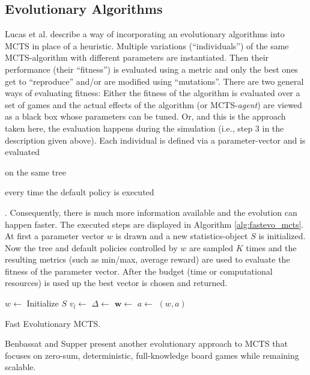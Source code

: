 \subsection{Evolutionary Algorithms}
\label{ss:evo_alg}
Lucas et al. \cite{lucas2014fast} describe a way of incorporating an evolutionary algorithms into  MCTS in place of a heuristic. Multiple variations (\enquote{individuals}) of the same MCTS-algorithm with different parameters are instantiated. Then their performance (their \enquote{fitness}) is evaluated using a metric and only the best ones get to \enquote{reproduce} and/or are modified using \enquote{mutations}. There are two general ways of evaluating fitness: Either the fitness of the algorithm is evaluated over a set of games and the actual effects of the algorithm (or MCTS-\textit{agent}) are viewed as a black box whose parameters can be tuned. Or, and this is the approach taken here, the evaluation happens during the simulation (i.e., step 3 in the description given above). Each individual is defined via a parameter-vector and is evaluated \begin{enumerate*}[label=\alph*)]
    \item on the same tree
    \item every time the default policy is executed 
\end{enumerate*}. Consequently, there is much more information available and the evolution can happen faster. The executed steps are displayed in Algorithm \ref{alg:fastevo_mcts}. At first a parameter vector $w$ is drawn and a new statistics-object $S$ is initialized. Now the tree and default policies controlled by $w$ are sampled $K$ times and the resulting metrics (such as min/max, average reward) are used to evaluate the fitness of the parameter vector. After the budget (time or computational resources) is used up the best vector is chosen and returned.
\begin{algorithm}[ht]
\begin{algorithmic}
    \State $w \gets$ 
    \State Initialize $S$
    \State $v_l \gets$ 
    \State $\Delta \gets$ 
    \State {}
    \State {}
    \EndFor
    \State {}
    \EndWhile
    \State $\mathbf{w} \gets$ 
    \State $a \gets$ 
    \State \Return $(w,a)$
\EndFunction
\end{algorithmic}
\caption{Fast Evolutionary MCTS.}
\label{alg:fastevo_mcts}
\end{algorithm}

Benbassat and Supper \cite{benbassat2014evomcts} present another evolutionary approach to MCTS that focuses on zero-sum, deterministic, full-knowledge board games while remaining scalable.
